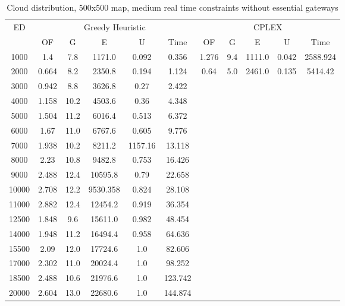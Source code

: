\begin{table}[htb]
	\centering
	\begin{tabular}{|c|c|c|c|c|c|c|c|c|c|c|}
		\hline
		\multirow{2}{*}{ED} & \multicolumn{5}{c|}{Greedy Heuristic} & \multicolumn{5}{c|}{CPLEX}\\ 
		\cline{2-11}
& OF & G & E & U & Time & OF & G & E & U & Time\\ 
		\hline
		1000 & 1.4 & 7.8 & 1171.0 & 0.092 & 0.356 & 1.276 & 9.4 & 1111.0 & 0.042 & 2588.924 \\ 
		2000 & 0.664 & 8.2 & 2350.8 & 0.194 & 1.124 & 0.64 & 5.0 & 2461.0 & 0.135 & 5414.42 \\ 
		3000 & 0.942 & 8.8 & 3626.8 & 0.27 & 2.422 & & & & &  \\ 
		4000 & 1.158 & 10.2 & 4503.6 & 0.36 & 4.348 & & & & &  \\ 
		5000 & 1.504 & 11.2 & 6016.4 & 0.513 & 6.372 & & & & &  \\ 
		6000 & 1.67 & 11.0 & 6767.6 & 0.605 & 9.776 & & & & &  \\ 
		7000 & 1.938 & 10.2 & 8211.2 & 1157.16 & 13.118 & & & & &  \\ 
		8000 & 2.23 & 10.8 & 9482.8 & 0.753 & 16.426 & & & & &  \\ 
		9000 & 2.488 & 12.4 & 10595.8 & 0.79 & 22.658 & & & & &  \\ 
		10000 & 2.708 & 12.2 & 9530.358 & 0.824 & 28.108 & & & & &  \\ 
		11000 & 2.882 & 12.4 & 12454.2 & 0.919 & 36.354 & & & & &  \\ 
		12500 & 1.848 & 9.6 & 15611.0 & 0.982 & 48.454 & & & & &  \\ 
		14000 & 1.948 & 11.2 & 16494.4 & 0.958 & 64.636 & & & & &  \\ 
		15500 & 2.09 & 12.0 & 17724.6 & 1.0 & 82.606 & & & & &  \\ 
		17000 & 2.302 & 11.0 & 20024.4 & 1.0 & 98.252 & & & & &  \\ 
		18500 & 2.488 & 10.6 & 21976.6 & 1.0 & 123.742 & & & & &  \\ 
		20000 & 2.604 & 13.0 & 22680.6 & 1.0 & 144.874 & & & & &  \\ 
		\hline 
	\end{tabular} 
	\caption{Cloud distribution, 500x500 map, medium real time constraints without essential gateways} 
	\label{tab:cloud_medium_n_esc_500} 
\end{table} 

